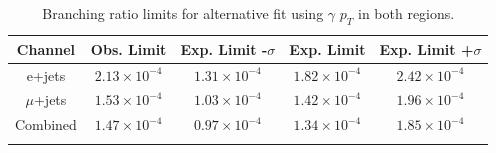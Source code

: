 \begin{table}[h!]
\begin{center}
{\renewcommand{\arraystretch}{1.2}
\begin{tabular}{ccccc}
\hhline{=====}
Channel  	&  Obs. Limit			&	Exp. Limit -$\sigma$	& Exp. Limit	& Exp. Limit +$\sigma$  \\  \hline 
e+jets	& $2.13\times10^{-4}$ 	& $1.31\times10^{-4}$	& $1.82\times10^{-4}$ & $2.42\times10^{-4}$	\\
$\mu$+jets	& $1.53\times10^{-4}$ 	& $1.03\times10^{-4}$	& $1.42\times10^{-4}$ & $1.96\times10^{-4}$	\\
Combined	& $1.47\times10^{-4}$ 	& $0.97\times10^{-4}$	& $1.34\times10^{-4}$ & $1.85\times10^{-4}$	\\
\hhline{=====}
\end{tabular}
\caption{Branching ratio limits for alternative fit using $\gamma$ $p_T$ in both regions.}
}
\end{center}
\end{table}


